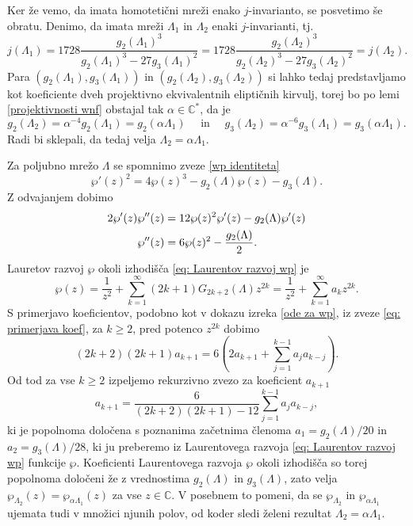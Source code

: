 \documentclass[mat1]{fmfdelo}
\numberwithin{equation}{section}
\newcommand{\C}{\mathbb C}
\newcommand{\HH}{\mathfrak{H}}
\newcommand{\CM}{\mathbb C ^*}
\newcommand{\htp}{\simeq}
\newcommand{\lattice}[2]{\left\langle #1, #2 \right\rangle}
\newcommand{\tj}{tj.\ }
\theoremstyle{definition}
\begin{document}
\begin{dokaz}
    Ker že vemo, da imata homotetični mreži enako $j$-invarianto, se posvetimo še obratu. Denimo, da imata mreži $\Lambda_1$ in $\Lambda_2$ enaki $j$-invarianti, \tj
    \[
        j(\Lambda_1) = 
        1728\frac{g_2(\Lambda_1)^3}{g_2(\Lambda_1)^3 - 27g_3(\Lambda_1)^2} =
        1728\frac{g_2(\Lambda_2)^3}{g_2(\Lambda_2)^3 - 27g_3(\Lambda_2)^2} = 
        j(\Lambda_2).
    \]
    Para $(g_2(\Lambda_1), g_3(\Lambda_1))$ in $(g_2(\Lambda_2), g_3(\Lambda_2))$ si lahko tedaj predstavljamo kot koeficiente dveh projektivno ekvivalentnih eliptičnih kirvulj, torej bo po lemi \ref{projektivnosti wnf} obstajal tak $\alpha \in \CM$, da je 
    \[
        g_2(\Lambda_2) = \alpha^{-4}g_2(\Lambda_1) = g_2(\alpha\Lambda_1) 
        \quad \text{ in } \quad
        g_3(\Lambda_2) = \alpha^{-6}g_3(\Lambda_1) = g_3(\alpha\Lambda_1). 
    \]
    Radi bi sklepali, da tedaj velja $\Lambda_2 = \alpha\Lambda_1$. 

    Za poljubno mrežo $\Lambda$ se spomnimo zveze \eqref{wp identiteta}
    \[
        \wp'(z)^2 = 4\wp(z)^3 - g_2(\Lambda)\wp(z) - g_3(\Lambda). 
    \]
    Z odvajanjem dobimo 
    \begin{align}
        \notag 2\wp'(z)\wp''(z) &= 12\wp(z)^2\wp'(z) - g_2(\Lambda)\wp'(z) \\
        \label{eq: primerjava koef} \wp''(z) &= 6\wp(z)^2 - \frac{g_2(\Lambda)}{2}.
    \end{align}
    Lauretov razvoj $\wp$ okoli izhodišča \eqref{eq: Laurentov razvoj wp} je
    \[
        \wp(z) = \frac{1}{z^2} + \sum_{k = 1}^\infty (2k+1)G_{2k+2}(\Lambda)z^{2k} = \frac{1}{z^2} + \sum_{k = 1}^\infty a_{k}z^{2k}.
    \] 
    S primerjavo koeficientov, podobno kot v dokazu izreka \ref{ode za wp}, iz zveze \eqref{eq: primerjava koef}, za $k \geq 2$, pred potenco $z^{2k}$ dobimo 
    \[
        (2k + 2)(2k + 1)a_{k+1} = 6 \left(2a_{k+1} + \sum_{j = 1}^{k-1}a_j a_{k-j}\right).
    \]
    Od tod za vse $k \geq 2$ izpeljemo rekurzivno zvezo za koeficient $a_{k+1}$
    \[
        a_{k+1} = \frac{6}{(2k + 2)(2k + 1) - 12}\sum_{j = 1}^{k-1}a_j a_{k-j},
    \]
    ki je popolnoma določena s poznanima začetnima členoma $a_1 = g_2(\Lambda)/20$ in $a_2 = g_3(\Lambda)/28$, ki ju preberemo iz Laurentovega razvoja \eqref{eq: Laurentov razvoj wp} funkcije $\wp$. Koeficienti Laurentovega razvoja $\wp$ okoli izhodišča so torej popolnoma določeni že z vrednostima $g_2(\Lambda)$ in $g_3(\Lambda)$, zato velja $\wp_{\Lambda_2}(z) = \wp_{\alpha\Lambda_1}(z)$ za vse $z \in \C$. V posebnem to pomeni, da se $\wp_{\Lambda_2}$ in $\wp_{\alpha\Lambda_1}$ ujemata tudi v množici njunih polov, od koder sledi želeni rezultat $\Lambda_2 = \alpha\Lambda_1$.
\end{dokaz}
\end{document}
